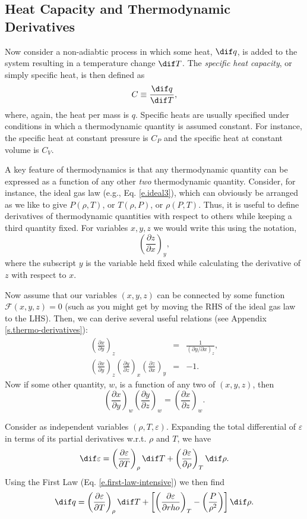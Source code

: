\subsection{Heat Capacity and Thermodynamic Derivatives}

Now consider a non-adiabtic process in which some heat, $\dif q$, is added to the system resulting in a temperature change $\dif T$.
The {\it specific heat capacity}, or simply specific heat, is then defined as
\[
	C \equiv \frac{\dif q}{\dif T},
\]
where, again, the heat per mass is $q$.
Specific heats are usually specified under conditions in which a thermodynamic quantity is assumed constant.
For instance, the specific heat at constant pressure is $C_P$ and the specific heat at constant volume is $C_V$.

A key feature of thermodynamics is that any thermodynamic quantity can be expressed as a function of any other {\it two} thermodynamic quantity.
Consider, for instance, the ideal gas law (e.g., Eq. \ref{e.ideal3}), which can obviously be arranged as we like to give $P(\rho, T)$, or $T(\rho, P)$, or $\rho(P,T)$.
Thus, it is useful to define derivatives of thermodynamic quantities with respect to others while keeping a third quantity fixed.
For variables $x, y, z$ we would write this using the notation,
\[
	\left(\frac{\partial z}{\partial x}\right)_y,
\]
where the subscript $y$ is the variable held fixed while calculating the derivative of $z$ with respect to $x$.

Now assume that our variables $(x,y,z)$ can be connected by some function $\mathcal{F}(x,y,z)=0$ (such as you might get by moving the RHS of the ideal gas law to the LHS).
Then, we can derive several useful relations (see Appendix \ref{s.thermo-derivatives}):
\begin{eqnarray}
	\left(\frac{\partial x}{\partial y}\right)_z &=& \frac{1}{(\partial y/\partial x)_z}, \\
	\left(\frac{\partial x}{\partial y}\right)_z \left(\frac{\partial y}{\partial z}\right)_x \left(\frac{\partial z}{\partial x}\right)_y &=& -1.
\end{eqnarray}
Now if some other quantity, $w$, is a function of any two of $(x,y,z)$, then
\begin{equation}
	\left(\frac{\partial x}{\partial y}\right)_w \left(\frac{\partial y}{\partial z}\right)_w = \left(\frac{\partial x}{\partial z}\right)_w.
\end{equation}

Consider as independent variables $(\rho, T, \varepsilon)$. Expanding the total differential of $\varepsilon$ in terms of its partial derivatives w.r.t. $\rho$ and $T$, we have
\[
	\dif \varepsilon = \left(\frac{\partial \varepsilon}{\partial T}\right)_\rho \dif T + \left(\frac{\partial \varepsilon}{\partial \rho}\right)_T \dif \rho.
\]
Using the First Law (Eq. \ref{e.first-law-intensive}) we then find
\begin{equation}
	\dif q = \left(\frac{\partial \varepsilon}{\partial T}\right)_\rho \dif T + \left[\left(\frac{\partial \varepsilon}{\partial rho}\right)_T - \left(\frac{P}{\rho^2}\right)\right] \dif \rho. \label{e.firstLaw2}
\end{equation}

